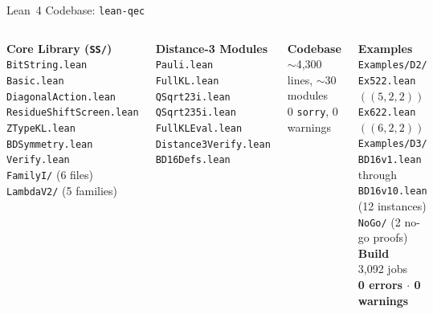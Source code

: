 \documentclass[aspectratio=169,t]{beamer}
\newcommand{\code}[1]{\texttt{\small #1}}
\begin{document}
\begin{frame}{Lean~4 Codebase: \texttt{lean-qec}}

\begin{columns}[T]
{\small\textbf{Core Library (\code{SS/})}}\\
\code{BitString.lean}\\
\code{Basic.lean}\\
\code{DiagonalAction.lean}\\
\code{ResidueShiftScreen.lean}\\
\code{ZTypeKL.lean}\\
\code{BDSymmetry.lean}\\
\code{Verify.lean}\\
\code{FamilyI/} \textcolor{Slate}{\scriptsize(6 files)}\\
\code{LambdaV2/} \textcolor{Slate}{\scriptsize(5 families)}

{\small\textbf{Distance-3 Modules}}\\
\code{Pauli.lean}\\
\code{FullKL.lean}\\
\code{QSqrt23i.lean}\\
\code{QSqrt235i.lean}\\
\code{FullKLEval.lean}\\
\code{Distance3Verify.lean}\\
\code{BD16Defs.lean}


{\small\textbf{Codebase}}\\
${\sim}$4,300 lines, ${\sim}$30 modules\\
0 \code{sorry},  0 warnings

{\small\textbf{Examples}}\\
\code{Examples/D2/}\\
\quad\code{Ex522.lean} \textcolor{Slate}{\scriptsize $((5,2,2))$}\\
\quad\code{Ex622.lean} \textcolor{Slate}{\scriptsize $((6,2,2))$}\\
\code{Examples/D3/}\\
\quad\code{BD16v1.lean} \textcolor{Slate}{\scriptsize through}\\
\quad\code{BD16v10.lean} \textcolor{Slate}{\scriptsize (12 instances)}\\
\quad\code{NoGo/} \textcolor{Slate}{\scriptsize (2 no-go proofs)}\\
{\small\textbf{Build}}\\
3,092 jobs\\
\textcolor{Sage}{\textbf{0 errors $\cdot$ 0 warnings}}
\end{columns}
\end{frame}
\end{document}
